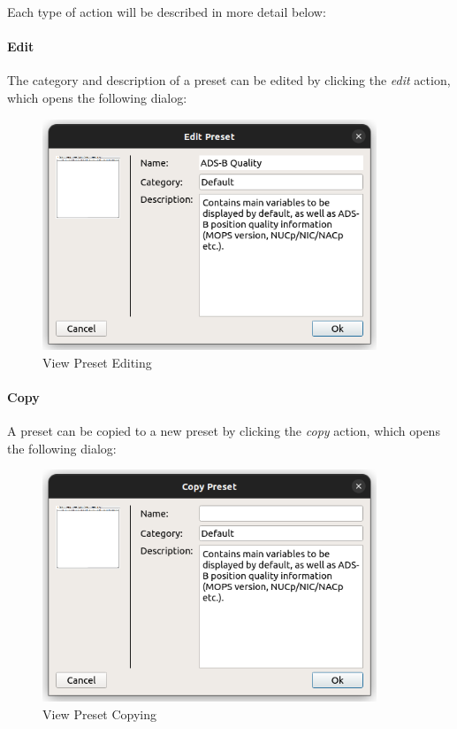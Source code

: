 Each type of action will be described in more detail below:

\paragraph*{Edit} The category and description of a preset can be edited by clicking the \textit{edit} action, which opens the following dialog:

\begin{figure}[H]
    \center
    \includegraphics[width=10cm]{figures/view_preset_edit.png}
  \caption{View Preset Editing}
\end{figure}

\paragraph*{Copy} A preset can be copied to a new preset by clicking the \textit{copy} action, which opens the following dialog:

\begin{figure}[H]
    \center
    \includegraphics[width=10cm]{figures/view_preset_copy.png}
  \caption{View Preset Copying}
\end{figure}


